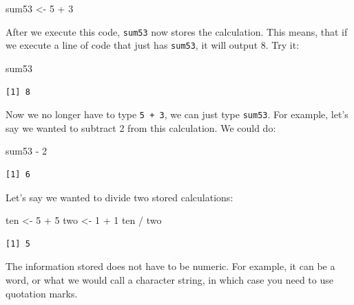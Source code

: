 \documentclass[
  letterpaper,
  DIV=11,
  numbers=noendperiod]{scrreprt}
\newenvironment{Shaded}{\begin{snugshade}}{\end{snugshade}}
\newcommand{\DecValTok}[1]{\textcolor[rgb]{0.68,0.00,0.00}{#1}}
\newcommand{\NormalTok}[1]{\textcolor[rgb]{0.00,0.23,0.31}{#1}}
\newcommand{\OtherTok}[1]{\textcolor[rgb]{0.00,0.23,0.31}{#1}}
\newcommand{\SpecialCharTok}[1]{\textcolor[rgb]{0.37,0.37,0.37}{#1}}
\begin{document}
\begin{Shaded}
\begin{Highlighting}[]
\NormalTok{sum53 }\OtherTok{\textless{}{-}} \DecValTok{5} \SpecialCharTok{+} \DecValTok{3}
\end{Highlighting}
\end{Shaded}

After we execute this code, \texttt{sum53} now stores the calculation.
This means, that if we execute a line of code that just has
\texttt{sum53}, it will output 8. Try it:

\begin{Shaded}
\begin{Highlighting}[]
\NormalTok{sum53}
\end{Highlighting}
\end{Shaded}

\begin{verbatim}
[1] 8
\end{verbatim}

Now we no longer have to type \texttt{5\ +\ 3}, we can just type
\texttt{sum53}. For example, let's say we wanted to subtract 2 from this
calculation. We could do:

\begin{Shaded}
\begin{Highlighting}[]
\NormalTok{sum53 }\SpecialCharTok{{-}} \DecValTok{2}
\end{Highlighting}
\end{Shaded}

\begin{verbatim}
[1] 6
\end{verbatim}

Let's say we wanted to divide two stored calculations:

\begin{Shaded}
\begin{Highlighting}[]
\NormalTok{ten }\OtherTok{\textless{}{-}} \DecValTok{5} \SpecialCharTok{+} \DecValTok{5}
\NormalTok{two }\OtherTok{\textless{}{-}} \DecValTok{1} \SpecialCharTok{+} \DecValTok{1}
\NormalTok{ten }\SpecialCharTok{/}\NormalTok{ two}
\end{Highlighting}
\end{Shaded}

\begin{verbatim}
[1] 5
\end{verbatim}

The information stored does not have to be numeric. For example, it can
be a word, or what we would call a character string, in which case you
need to use quotation marks.
\end{document}
